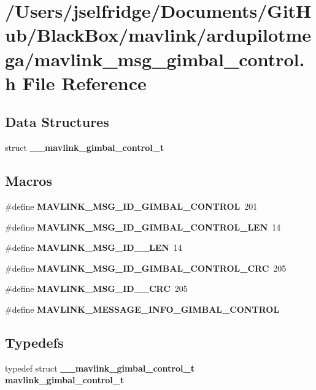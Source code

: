 \section{/\+Users/jselfridge/\+Documents/\+Git\+Hub/\+Black\+Box/mavlink/ardupilotmega/mavlink\+\_\+msg\+\_\+gimbal\+\_\+control.h File Reference}
\label{mavlink__msg__gimbal__control_8h}
\subsection*{Data Structures}
\begin{DoxyCompactItemize}
\item 
struct \textbf{ \+\_\+\+\_\+mavlink\+\_\+gimbal\+\_\+control\+\_\+t}
\end{DoxyCompactItemize}
\subsection*{Macros}
\begin{DoxyCompactItemize}
\item 
\#define \textbf{ M\+A\+V\+L\+I\+N\+K\+\_\+\+M\+S\+G\+\_\+\+I\+D\+\_\+\+G\+I\+M\+B\+A\+L\+\_\+\+C\+O\+N\+T\+R\+OL}~201
\item 
\#define \textbf{ M\+A\+V\+L\+I\+N\+K\+\_\+\+M\+S\+G\+\_\+\+I\+D\+\_\+\+G\+I\+M\+B\+A\+L\+\_\+\+C\+O\+N\+T\+R\+O\+L\+\_\+\+L\+EN}~14
\item 
\#define \textbf{ M\+A\+V\+L\+I\+N\+K\+\_\+\+M\+S\+G\+\_\+\+I\+D\+\_\+\_\+\+L\+EN}~14
\item 
\#define \textbf{ M\+A\+V\+L\+I\+N\+K\+\_\+\+M\+S\+G\+\_\+\+I\+D\+\_\+\+G\+I\+M\+B\+A\+L\+\_\+\+C\+O\+N\+T\+R\+O\+L\+\_\+\+C\+RC}~205
\item 
\#define \textbf{ M\+A\+V\+L\+I\+N\+K\+\_\+\+M\+S\+G\+\_\+\+I\+D\+\_\+\_\+\+C\+RC}~205
\item 
\#define \textbf{ M\+A\+V\+L\+I\+N\+K\+\_\+\+M\+E\+S\+S\+A\+G\+E\+\_\+\+I\+N\+F\+O\+\_\+\+G\+I\+M\+B\+A\+L\+\_\+\+C\+O\+N\+T\+R\+OL}
\end{DoxyCompactItemize}
\subsection*{Typedefs}
\begin{DoxyCompactItemize}
\item 
typedef struct \textbf{ \+\_\+\+\_\+mavlink\+\_\+gimbal\+\_\+control\+\_\+t} \textbf{ mavlink\+\_\+gimbal\+\_\+control\+\_\+t}
\end{DoxyCompactItemize}


